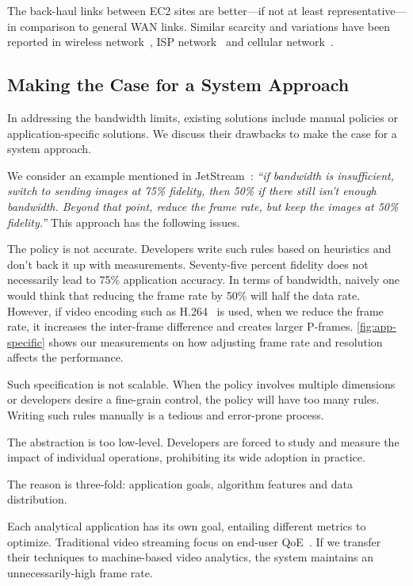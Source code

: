The back-haul links between EC2 sites are better---if not at least
representative---in comparison to general WAN links. Similar scarcity and
variations have been reported in wireless network~\cite{biswas2015large}, ISP
network~\cite{grover2013peeking} and cellular
network~\cite{nikravesh2014mobile}.

\subsection{Making the Case for a System Approach}
\label{sec:making-case-sys-approach}

In addressing the bandwidth limits, existing solutions include manual policies
or application-specific solutions. We discuss their drawbacks to make the case
for a system approach.

 We consider an example mentioned in
JetStream~\cite{rabkin2014aggregation}: \textit{``if bandwidth is insufficient,
  switch to sending images at 75\% fidelity, then 50\% if there still isn't
  enough bandwidth. Beyond that point, reduce the frame rate, but keep the
  images at 50\% fidelity.''} This approach has the following issues.

The policy is not accurate. Developers write such rules based on heuristics and
don't back it up with measurements. Seventy-five percent fidelity does not
necessarily lead to 75\% application accuracy. In terms of bandwidth, naively
one would think that reducing the frame rate by 50\% will half the data
rate. However, if video encoding such as H.264~\cite{richardson2011h} is used,
when we reduce the frame rate, it increases the inter-frame difference and
creates larger P-frames. \autoref{fig:app-specific} shows our measurements on
how adjusting frame rate and resolution affects the performance.

Such specification is not scalable. When the policy involves multiple dimensions
or developers desire a fine-grain control, the policy will have too many rules.
Writing such rules manually is a tedious and error-prone process.

The abstraction is too low-level. Developers are forced to study and measure the
impact of individual operations, prohibiting its wide adoption in practice.

 The reason is
three-fold: application goals, algorithm features and data distribution.

Each analytical application has its own goal, entailing different metrics to
optimize. Traditional video streaming focus on end-user
QoE~\cite{yin2015control, michalos2012dynamic, pantos2016http}. If we transfer
their techniques to machine-based video analytics, the system maintains an
unnecessarily-high frame rate.

